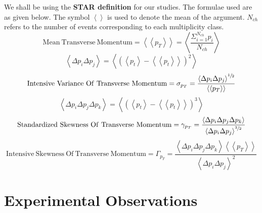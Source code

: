 \documentclass[letterpaper,aps,prc,superscriptaddress,nofootinbib,10pt,showpacs,floatfix]{revtex4-2}%
\newcommand{\bfrac}[2]{\frac{\displaystyle #1}{\displaystyle #2}}
\begin{document}

We shall be using the \textbf{STAR definition} for our studies. The formulae used are as given below. The symbol $\left<\right>$ is used to denote the mean of the argument. $N_{ch}$ refers to the number of events corresponding to each multiplicity class.
\vspace{-5mm}
\begin{equation}
\label{eq:1}
\mathrm{Mean\ Transverse\ Momentum}=\left<\left<p_T\right>\right>=\left<\bfrac{\Sigma_{i=1}^{N_{ch}} p_i}{N_{ch}}\right>
\end{equation}
\vspace{-5mm}
\begin{equation}
\label{eq:2}
\left<\Delta p_i \Delta p_j\right>=\left<\left(\left<p_t\right>-\left<\left<p_t\right>\right>\right)^2\right>
\end{equation}
\vspace{-5mm}
\begin{equation}
\label{eq:3}
\mathrm{Intensive\ Variance\ Of\ Transverse\ Momentum}=\sigma_{p_T}=\bfrac{\left<\Delta p_i \Delta p_j\right>^{\sfrac{1}{2}}}{\left<\left<p_T\right>\right>}
\end{equation}
\vspace{-5mm}
\begin{equation}
\label{eq:4}
\left<\Delta p_i \Delta p_j \Delta p_k\right>=\left<\left(\left<p_t\right>-\left<\left<p_t\right>\right>\right)^3\right>
\end{equation}
\vspace{-5mm}
\begin{equation}
\label{eq:5}
\mathrm{Standardized\ Skewness\ Of\ Transverse\ Momentum} = \gamma_{p_T}=\bfrac{\left<\Delta p_i \Delta p_j \Delta p_k\right>}{\left<\Delta p_i \Delta p_j\right>^{\sfrac{3}{2}}}
\end{equation}
\vspace{-5mm}
\begin{equation}
\label{eq:6}
\mathrm{ Intensive\ Skewness\ Of\ Transverse\ Momentum}= 
\Gamma_{p_T}= \bfrac{\left<\Delta p_i \Delta p_j \Delta p_k\right>\left<\left<p_T\right>\right>}{\left<\Delta p_i \Delta p_j\right>^2}
\end{equation}


\section{Experimental Observations }
\end{document}
